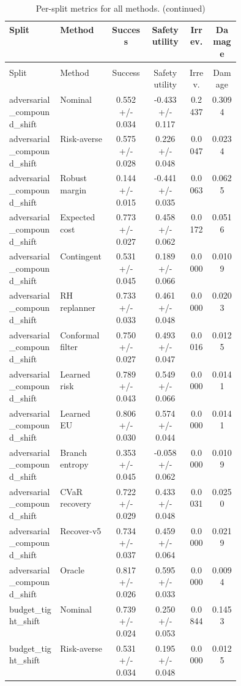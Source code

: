\documentclass{article}
\begin{document}
\begin{center}
\scriptsize
\begin{longtable}{p{0.22\linewidth}p{0.22\linewidth}cccc}
\caption{Per-split metrics for all methods.}\label{tab:split-metrics}\\
\toprule
Split & Method & Success & Safety utility & Irrev. & Damage\\
\midrule
\endfirsthead
\caption[]{Per-split metrics for all methods. (continued)}\\
\toprule
Split & Method & Success & Safety utility & Irrev. & Damage\\
\midrule
\endhead
adversarial\_compound\_shift & Nominal & 0.552 +/- 0.034 & -0.433 +/- 0.117 & 0.2437 & 0.3094\\
adversarial\_compound\_shift & Risk-averse & 0.575 +/- 0.028 & 0.226 +/- 0.048 & 0.0047 & 0.0234\\
adversarial\_compound\_shift & Robust margin & 0.144 +/- 0.015 & -0.441 +/- 0.035 & 0.0063 & 0.0625\\
adversarial\_compound\_shift & Expected cost & 0.773 +/- 0.027 & 0.458 +/- 0.062 & 0.0172 & 0.0516\\
adversarial\_compound\_shift & Contingent & 0.531 +/- 0.045 & 0.189 +/- 0.066 & 0.0000 & 0.0109\\
adversarial\_compound\_shift & RH replanner & 0.733 +/- 0.033 & 0.461 +/- 0.048 & 0.0000 & 0.0203\\
adversarial\_compound\_shift & Conformal filter & 0.750 +/- 0.027 & 0.493 +/- 0.047 & 0.0016 & 0.0125\\
adversarial\_compound\_shift & Learned risk & 0.789 +/- 0.043 & 0.549 +/- 0.066 & 0.0000 & 0.0141\\
adversarial\_compound\_shift & Learned EU & 0.806 +/- 0.030 & 0.574 +/- 0.044 & 0.0000 & 0.0141\\
adversarial\_compound\_shift & Branch entropy & 0.353 +/- 0.045 & -0.058 +/- 0.062 & 0.0000 & 0.0109\\
adversarial\_compound\_shift & CVaR recovery & 0.722 +/- 0.029 & 0.433 +/- 0.048 & 0.0031 & 0.0250\\
adversarial\_compound\_shift & Recover-v5 & 0.734 +/- 0.037 & 0.459 +/- 0.064 & 0.0000 & 0.0219\\
adversarial\_compound\_shift & Oracle & 0.817 +/- 0.026 & 0.595 +/- 0.033 & 0.0000 & 0.0094\\
budget\_tight\_shift & Nominal & 0.739 +/- 0.024 & 0.250 +/- 0.053 & 0.0844 & 0.1453\\
budget\_tight\_shift & Risk-averse & 0.531 +/- 0.034 & 0.195 +/- 0.048 & 0.0000 & 0.0125\\

\end{longtable}
\end{center}
\end{document}
